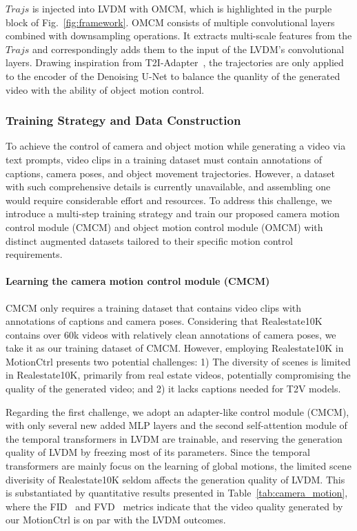 \documentclass[sigconf]{acmart}
\begin{document}
$Trajs$ is injected into LVDM with OMCM, which is highlighted in the purple block of Fig.~\ref{fig:framework}. OMCM consists of multiple convolutional layers combined with downsampling operations. It extracts multi-scale features from the $Trajs$ and correspondingly adds them to the input of the LVDM's convolutional layers. Drawing inspiration from T2I-Adapter~\cite{mou2024t2i}, the trajectories are only applied to the encoder of the Denoising U-Net to balance the quanlity of the generated video with the ability of object motion control.

\subsubsection{Training Strategy and Data Construction}
\label{sec:training_strategy}
To achieve the control of camera and object motion while generating a video via text prompts, video clips in a training dataset must contain annotations of captions, camera poses, and object movement trajectories. However, a dataset with such comprehensive details is currently unavailable, and assembling one would require considerable effort and resources. To address this challenge, we introduce a multi-step training strategy and train our proposed camera motion control module (CMCM) and object motion control module (OMCM) with distinct augmented datasets tailored to their specific motion control requirements.

\paragraph{Learning the camera motion control module (CMCM)} CMCM only requires a training dataset that contains video clips with annotations of captions and camera poses. Considering that Realestate10K \cite{zhou2018stereo} contains over 60k videos with relatively clean annotations of camera poses, we take it as our training dataset of CMCM. However, employing Realestate10K in MotionCtrl presents two potential challenges: 1) The diversity of scenes is limited in Realestate10K, primarily from real estate videos, potentially compromising the quality of the generated video; and 2) it lacks captions needed for T2V models. 

Regarding the first challenge, we adopt an adapter-like control module (CMCM), with only several new added MLP layers and the second self-attention module of the temporal transformers in LVDM are trainable, and reserving the generation quality of LVDM by freezing most of its parameters. Since the temporal transformers are mainly focus on the learning of global motions, the limited scene diverisity of Realestate10K seldom affects the generation quality of LVDM. This is substantiated by quantitative results presented in Table~\ref{tab:camera_motion}, where the FID~\cite{fid} and FVD~\cite{fvd} metrics indicate that the video quality generated by our MotionCtrl is on par with the LVDM outcomes. 
\end{document}
